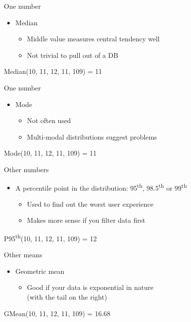 \documentclass{beamer}
\begin{document}
\begin{frame}{One number}
  \begin{itemize}
  \item Median
    \begin{itemize}
    \item Middle value measures central tendency well
    \item Not trivial to pull out of a DB
    \end{itemize}
  \end{itemize}
  \begin{center}
  \Large{ Median(10, 11, 12, 11, 109) = 11 }
  \end{center}
\end{frame}

\begin{frame}{One number}
  \begin{itemize}
  \item Mode
    \begin{itemize}
    \item Not often used
    \item Multi-modal distributions suggest problems
    \end{itemize}
  \end{itemize}
  \begin{center}
  \Large{ Mode(10, 11, 12, 11, 109) = 11 }
  \end{center}
\end{frame}

\begin{frame}{Other numbers}
  \begin{itemize}
  \item A percentile point in the distribution: 95\textsuperscript{th}, 98.5\textsuperscript{th} or 99\textsuperscript{th}
    \begin{itemize}
    \item Used to find out the worst user experience
    \item Makes more sense if you filter data first
    \end{itemize}
  \end{itemize}
  \begin{center}
  \Large{ P95\textsuperscript{th}(10, 11, 12, 11, 109) = 12 }
  \end{center}
\end{frame}

\begin{frame}{Other means}
  \begin{itemize}
  \item Geometric mean
    \begin{itemize}
    \item Good if your data is exponential in nature \\ (with the tail on the right)
    \end{itemize}
  \end{itemize}
  \begin{center}
  \Large{ GMean(10, 11, 12, 11, 109) = 16.68 }
  \end{center}
\end{frame}
\end{document}

